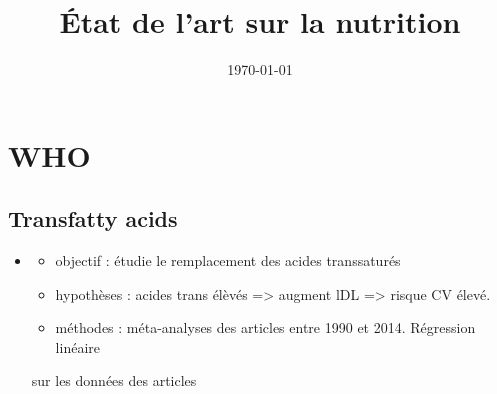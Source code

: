 \documentclass[11pt]{article}
\date{\today}
\title{État de l'art sur la nutrition}
\begin{document}
\maketitle
\tableofcontents


\section{WHO}
\label{sec:org4485e2a}
\subsection{Transfatty acids}
\label{sec:orge4906f9}
\begin{itemize}
\item \cite{brouwer2016effectBrouwer}
\begin{itemize}
\item objectif : étudie le remplacement des acides transsaturés
\item hypothèses : acides trans élèvés => augment lDL => risque CV élevé.
\item méthodes : méta-analyses des articles entre 1990 et 2014. Régression linéaire
\end{itemize}
sur les données des articles
\end{itemize}
\end{document}
